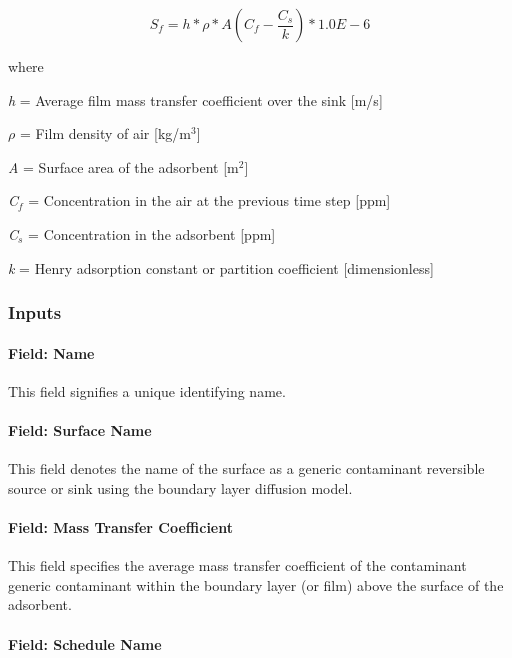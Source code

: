 \begin{equation}
{S_f} = h*\rho *A\left( {{C_f} - \frac{{{C_s}}}{k}} \right)*1.0E - 6
\end{equation}

where

\emph{h} = Average film mass transfer coefficient over the sink {[}m/s{]}

\(\rho\) = Film density of air {[}kg/m\(^{3}\){]}

\emph{A} = Surface area of the adsorbent {[}m\(^{2}\){]}

\emph{C\(_{f}\)} = Concentration in the air at the previous time step {[}ppm{]}

\emph{C\(_{s}\)} = Concentration in the adsorbent {[}ppm{]}

\emph{k} = Henry adsorption constant or partition coefficient {[}dimensionless{]}

\subsubsection{Inputs}\label{inputs-15-006}

\paragraph{Field: Name}\label{field-name-15-004}

This field signifies a unique identifying name.

\paragraph{Field: Surface Name}\label{field-surface-name-3-000}

This field denotes the name of the surface as a generic contaminant reversible source or sink using the boundary layer diffusion model.

\paragraph{Field: Mass Transfer Coefficient}\label{field-mass-transfer-coefficient}

This field specifies the average mass transfer coefficient of the contaminant generic contaminant within the boundary layer (or film) above the surface of the adsorbent.

\paragraph{Field: Schedule Name}\label{field-schedule-name-8}

